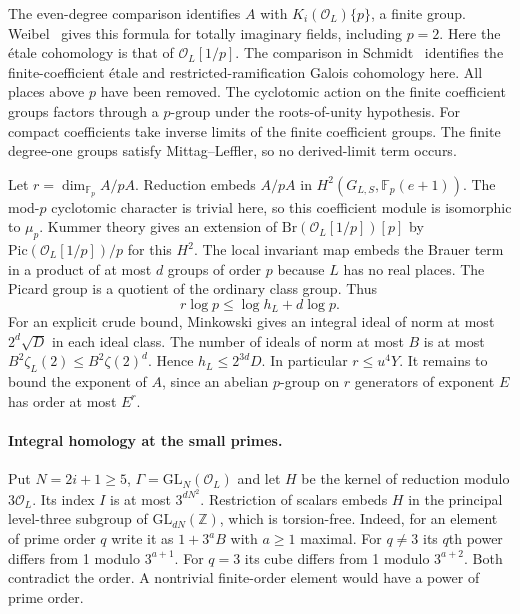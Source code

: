 The even-degree comparison identifies $A$ with $K_i(\mathcal O_L)\{p\}$, a finite group. Weibel~\cite[Thm.~73]{weibelK} gives this formula for totally imaginary fields, including $p=2$. Here the étale cohomology is that of $\mathcal O_L[1/p]$. The comparison in Schmidt~\cite[Prop.~2.3 and its proof]{badSchmidt} identifies the finite-coefficient étale and restricted-ramification Galois cohomology here. All places above $p$ have been removed. The cyclotomic action on the finite coefficient groups factors through a $p$-group under the roots-of-unity hypothesis. For compact coefficients take inverse limits of the finite coefficient groups. The finite degree-one groups satisfy Mittag–Leffler, so no derived-limit term occurs.

Let $r=\dim_{\mathbb F_p} A/pA$. Reduction embeds $A/pA$ in $H^2(G_{L,S},\mathbb F_p(e+1))$. The mod-$p$ cyclotomic character is trivial here, so this coefficient module is isomorphic to $\mu_p$. Kummer theory gives an extension of $\mathrm{Br}(\mathcal O_L[1/p])[p]$ by $\mathrm{Pic}(\mathcal O_L[1/p])/p$ for this $H^2$. The local invariant map embeds the Brauer term in a product of at most $d$ groups of order $p$ because $L$ has no real places. The Picard group is a quotient of the ordinary class group. Thus
\[r\log p\le\log h_L+d\log p.\]
For an explicit crude bound, Minkowski gives an integral ideal of norm at most $2^d\sqrt D$ in each ideal class. The number of ideals of norm at most $B$ is at most $B^2\zeta_L(2)\le B^2\zeta(2)^d$. Hence $h_L\le 2^{3d}D$. In particular $r\le u^4Y$. It remains to bound the exponent of $A$, since an abelian $p$-group on $r$ generators of exponent $E$ has order at most $E^r$.

\paragraph{Integral homology at the small primes.}

Put $N=2i+1\ge5$, $\Gamma=\mathrm{GL}_N(\mathcal O_L)$ and let $H$ be the kernel of reduction modulo $3\mathcal O_L$. Its index $I$ is at most $3^{dN^2}$. Restriction of scalars embeds $H$ in the principal level-three subgroup of $\mathrm{GL}_{dN}(\mathbb Z)$, which is torsion-free. Indeed, for an element of prime order $q$ write it as $1+3^aB$ with $a\ge1$ maximal. For $q\ne3$ its $q$th power differs from 1 modulo $3^{a+1}$. For $q=3$ its cube differs from 1 modulo $3^{a+2}$. Both contradict the order. A nontrivial finite-order element would have a power of prime order.


